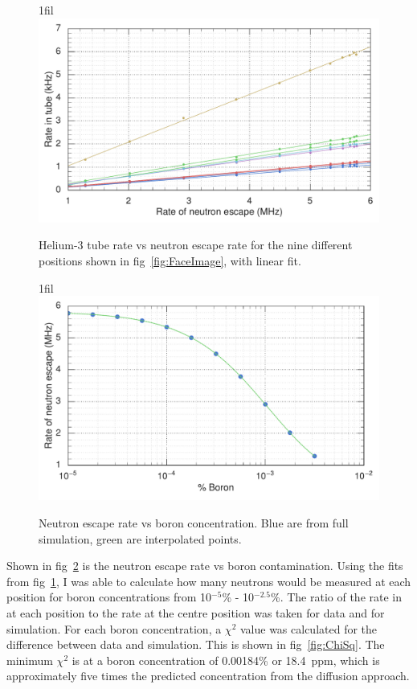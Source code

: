 \documentclass{article}
\makeatletter
\newcommand*{\centerfloat}{%
  \parindent \z@
  \leftskip \z@ \@plus 1fil \@minus \textwidth
  \rightskip\leftskip
  \parfillskip \z@skip}
\makeatother
\begin{document}
\begin{figure}
	\centerfloat
	\includegraphics[width=\columnwidth]{images/TubeRateVsEscapeRate}
	\caption{Helium-3 tube rate vs neutron escape rate for the nine different positions shown in fig~\ref{fig:FaceImage}, with linear fit.}	
	\label{fig:TubeRateVsEscape}
\end{figure}

\begin{figure}
	\centerfloat
	\includegraphics[width=\columnwidth]{images/EscapeRateVsBoron}
	\caption{Neutron escape rate vs boron concentration. Blue are from full simulation, green are interpolated points.}	
	\label{fig:EscapeRate}
\end{figure}



Shown in fig~\ref{fig:EscapeRate} is the neutron escape rate vs boron contamination. Using the fits from fig~\ref{fig:TubeRateVsEscape}, I was able to calculate how many neutrons would be measured at each position for boron concentrations from 10$^{-5}$\% - 10$^{-2.5}$\%. The ratio of the rate in at each position to the rate at the centre position was taken for data and for simulation. For each boron concentration, a $\chi^2$ value was calculated for the difference between data and simulation. This is shown in fig~\ref{fig:ChiSq}. The minimum $\chi^2$ is at a boron concentration of 0.00184\% or 18.4~ppm, which is approximately five times the predicted concentration from the diffusion approach.
\end{document}
